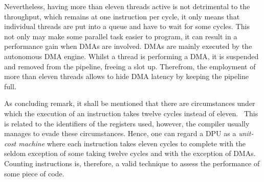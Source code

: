 Nevertheless, having more than eleven threads active is not detrimental to the throughput, which remains at one instruction per cycle, it only means that individual threads are put into a queue and have to wait for some cycles.
This not only may make some parallel task easier to program, it can result in a performance gain when \acp{DMA} are involved.
\Acp{DMA} are mainly executed by the autonomous \ac{DMA} engine.
Whilst a thread is performing a \ac{DMA}, it is suspended and removed from the pipeline, freeing a slot up.
Therefrom, the employment of more than eleven threads allows to hide \ac{DMA} latency by keeping the pipeline full.

As concluding remark, it shall be mentioned that there are circumstances under which the execution of an instruction takes twelve cycles instead of eleven.~\cite[Instruction Set Architecture -- Efficient scheduling]{upmemSDK}
This is related to the identifiers of the registers used, however, the compiler usually manages to evade these circumstances.
Hence, one can regard a \ac{DPU} as a \emph{unit-cost machine} where each instruction takes eleven cycles to complete with the seldom exception of some taking twelve cycles and with the exception of \acp{DMA}.
Counting instructions is, therefore, a valid technique to assess the performance of some piece of code.
